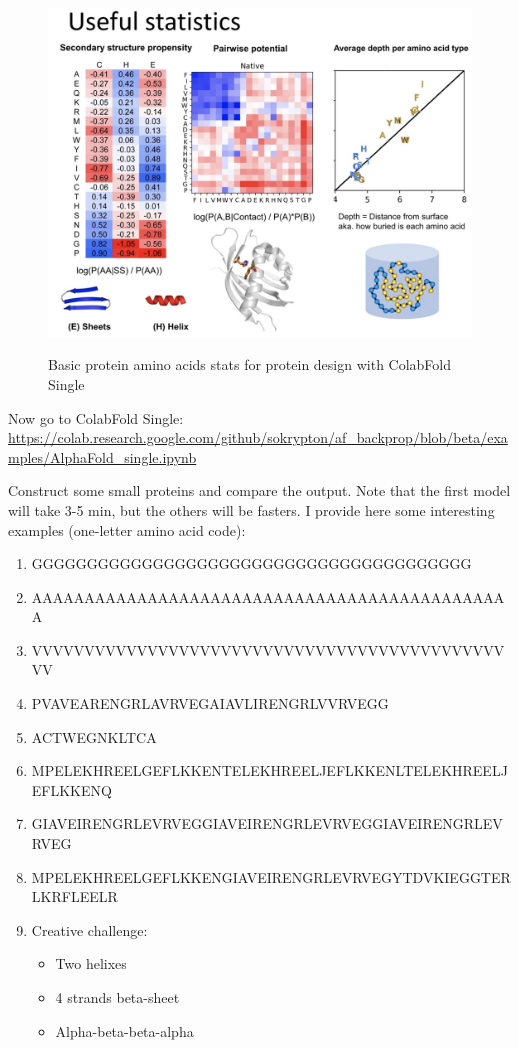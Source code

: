 \documentclass[
  letterpaper,
  DIV=11,
  numbers=noendperiod]{scrreprt}
\begin{document}
\begin{figure}

{\centering 

\href{https://twitter.com/sokrypton/status/1535857255647690753}{\includegraphics{./pics/cheatsheet.png}}

}

\caption{Basic protein amino acids stats for protein design with
ColabFold Single}

\end{figure}

Now go to ColabFold Single:
\url{https://colab.research.google.com/github/sokrypton/af_backprop/blob/beta/examples/AlphaFold_single.ipynb}

Construct some small proteins and compare the output. Note that the
first model will take 3-5 min, but the others will be fasters. I provide
here some interesting examples (one-letter amino acid code):

\begin{enumerate}
\def\labelenumi{\arabic{enumi}.}
\item
  GGGGGGGGGGGGGGGGGGGGGGGGGGGGGGGGGGGGGGGG
\item
  AAAAAAAAAAAAAAAAAAAAAAAAAAAAAAAAAAAAAAAAAAAAAA
\item
  VVVVVVVVVVVVVVVVVVVVVVVVVVVVVVVVVVVVVVVVVVVVVVV
\item
  PVAVEARENGRLAVRVEGAIAVLIRENGRLVVRVEGG
\item
  ACTWEGNKLTCA
\item
  MPELEKHREELGEFLKKENTELEKHREELJEFLKKENLTELEKHREELJEFLKKENQ
\item
  GIAVEIRENGRLEVRVEGGIAVEIRENGRLEVRVEGGIAVEIRENGRLEVRVEG
\item
  MPELEKHREELGEFLKKENGIAVEIRENGRLEVRVEGYTDVKIEGGTERLKRFLEELR
\item
  Creative challenge:

  \begin{itemize}
  \item
    Two helixes
  \item
    4 strands beta-sheet
  \item
    Alpha-beta-beta-alpha
  \end{itemize}
\end{enumerate}
\end{document}
